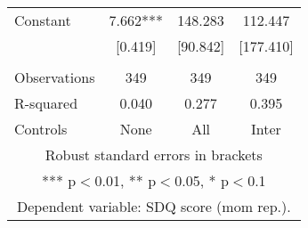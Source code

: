 \begin{tabular}{lccc}
Constant & 7.662*** & 148.283 & 112.447 \\
 & [0.419] & [90.842] & [177.410] \\
 &  &  &  \\
Observations & 349 & 349 & 349 \\
R-squared & 0.040 & 0.277 & 0.395 \\
 Controls & None & All & Inter \\ \hline
\multicolumn{4}{c}{ Robust standard errors in brackets} \\
\multicolumn{4}{c}{ *** p$<$0.01, ** p$<$0.05, * p$<$0.1} \\
\multicolumn{4}{c}{ Dependent variable: SDQ score (mom rep.).} \\
\end{tabular}
